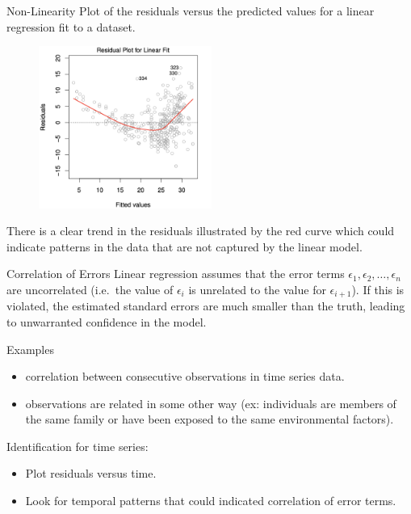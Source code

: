 \documentclass[
  ignorenonframetext,
  aspectratio=169,
]{beamer}
\begin{document}
\begin{frame}{Non-Linearity}
\protect\hypertarget{non-linearity-1}{}
Plot of the residuals versus the predicted values for a linear
regression fit to a dataset.

\begin{figure}

{\centering \includegraphics[width=2.22917in,height=\textheight]{images/residuals-01.png}

}

\end{figure}

There is a clear trend in the residuals illustrated by the red curve
which could indicate patterns in the data that are not captured by the
linear model.
\end{frame}

\begin{frame}{Correlation of Errors}
\protect\hypertarget{correlation-of-errors}{}
Linear regression assumes that the error terms
\(\epsilon_{1}, \epsilon_{2}, \ldots, \epsilon_{n}\) are uncorrelated
(i.e.~the value of \(\epsilon_{i}\) is unrelated to the value for
\(\epsilon_{i+1}\)). If this is violated, the estimated standard errors
are much smaller than the truth, leading to unwarranted confidence in
the model.

Examples

\begin{itemize}
\item
  correlation between consecutive observations in time series data.
\item
  observations are related in some other way (ex: individuals are
  members of the same family or have been exposed to the same
  environmental factors).
\end{itemize}

Identification for time series:

\begin{itemize}
\item
  Plot residuals versus time.
\item
  Look for temporal patterns that could indicated correlation of error
  terms.
\end{itemize}
\end{frame}
\end{document}
